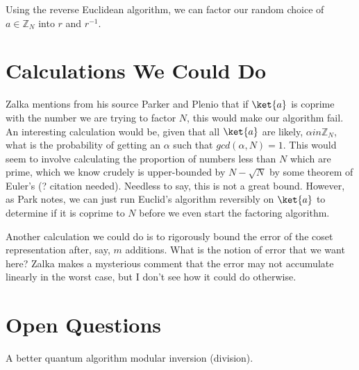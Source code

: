 \documentclass{article}
\begin{document}
Using the reverse Euclidean algorithm, we can factor our random choice of
$a \in \mathbb{Z}_N$ into $r$ and $r^{-1}$.

\section{Calculations We Could Do}

Zalka mentions from his source Parker and Plenio \cite{Parker2000} that if
$\ket{a}$ is coprime with the number we are trying to factor $N$, this would
make our algorithm fail. An interesting calculation would be, given that all
$\ket{a}$ are likely, $\alpha in \mathbb{Z}_N$, what is the probability of
getting an $\alpha$ such that $gcd(\alpha, N) = 1$. This would seem to
involve calculating the proportion of numbers less than $N$ which are
prime, which we know crudely is upper-bounded by $N - \sqrt{N}$ by
some theorem of Euler's (? citation needed). Needless to say, this is not a
great bound. However, as Park notes, we can just run Euclid's algorithm
reversibly on $\ket{a}$ to determine if it is coprime to $N$ before we
even start the factoring algorithm.

Another calculation we could do is to rigorously bound the error of the
coset representation after, say, $m$ additions. What is the notion of error
that we want here?
Zalka makes a mysterious
comment that the error may not accumulate linearly in the worst case, but
I don't see how it could do otherwise.

\section{Open Questions}

A better quantum algorithm modular inversion (division).



\end{document}
